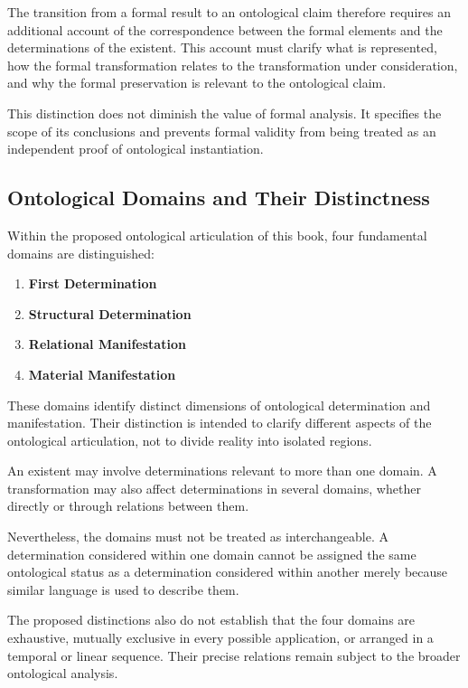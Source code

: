 The transition from a formal result to an ontological
claim therefore requires an additional account of
the correspondence between the formal elements
and the determinations of the existent. This account
must clarify what is represented, how the formal
transformation relates to the transformation under
consideration, and why the formal preservation is
relevant to the ontological claim.

This distinction does not diminish the value of
formal analysis. It specifies the scope of its
conclusions and prevents formal validity from
being treated as an independent proof of
ontological instantiation.

\subsection{Ontological Domains and Their Distinctness}

Within the proposed ontological articulation of
this book, four fundamental domains are distinguished:

\begin{enumerate}
    \item \textbf{First Determination}
    \item \textbf{Structural Determination}
    \item \textbf{Relational Manifestation}
    \item \textbf{Material Manifestation}
\end{enumerate}

These domains identify distinct dimensions of
ontological determination and manifestation.
Their distinction is intended to clarify different
aspects of the ontological articulation, not to
divide reality into isolated regions.

An existent may involve determinations relevant
to more than one domain. A transformation may
also affect determinations in several domains,
whether directly or through relations between them.

Nevertheless, the domains must not be treated
as interchangeable. A determination considered
within one domain cannot be assigned the same
ontological status as a determination considered
within another merely because similar language
is used to describe them.

The proposed distinctions also do not establish
that the four domains are exhaustive, mutually
exclusive in every possible application, or
arranged in a temporal or linear sequence.
Their precise relations remain subject to
the broader ontological analysis.

